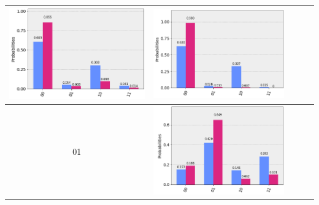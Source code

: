 \documentclass[11pt]{article}
\begin{document}
\begin{table}[h!]
\begin{tabular}{| c | c | c | c | c | }
\begin{minipage}{.215\textwidth}
        \includegraphics[width=\linewidth]{img/qecc3_Z00.png}
      \end{minipage}
      &\begin{minipage}{.215\textwidth}
        \includegraphics[width=\linewidth]{img/qecc3_I00.png}
      \end{minipage}
      \\ \hline
      01 & 
      \begin{minipage}{.215\textwidth}
        \includegraphics[width=\linewidth]{img/qecc3_X01.png}

\end{minipage}
\end{tabular}
\end{table}
\end{document}

